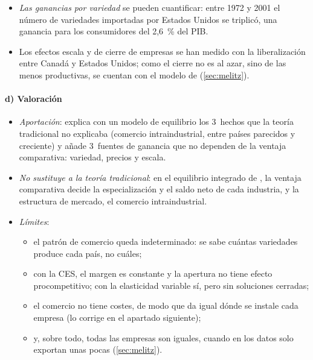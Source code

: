 \documentclass[11pt]{article}
\begin{document}
\begin{itemize}
\item \emph{Las ganancias por variedad} se pueden cuantificar: entre 1972 y 2001 el número de variedades importadas por Estados Unidos se triplicó, una ganancia para los consumidores del 2,6~\% del PIB\nocite{BrodaWeinstein2006Globalization}.
\item Los efectos escala y de cierre de empresas se han medido con la liberalización entre Canadá y Estados Unidos; como el cierre no es al azar, sino de las menos productivas, se cuentan con el modelo de  (\ref{sec:melitz}).
\end{itemize}


\paragraph{d) Valoración}

\begin{itemize}
\item \emph{Aportación}: explica con un modelo de equilibrio los 3~hechos que la teoría tradicional no explicaba (comercio intraindustrial, entre países parecidos y creciente) y añade 3~fuentes de ganancia que no dependen de la ventaja comparativa: variedad, precios y escala.
\item \emph{No sustituye a la teoría tradicional}: en el equilibrio integrado de \textcite{HelpmanKrugman1985Market}, la ventaja comparativa decide la especialización y el saldo neto de cada industria, y la estructura de mercado, el comercio intraindustrial.
\item \emph{Límites}:
  \begin{itemize}
  \item el patrón de comercio queda indeterminado: se sabe cuántas variedades produce cada país, no cuáles;
  \item con la CES, el margen es constante y la apertura no tiene efecto procompetitivo; con la elasticidad variable sí, pero sin soluciones cerradas;
  \item el comercio no tiene costes, de modo que da igual dónde se instale cada empresa (lo corrige \textcite{Krugman1980Scale} en el apartado siguiente);
  \item y, sobre todo, todas las empresas son iguales, cuando en los datos solo exportan unas pocas (\ref{sec:melitz}).
  \end{itemize}
\end{itemize}

\end{document}
